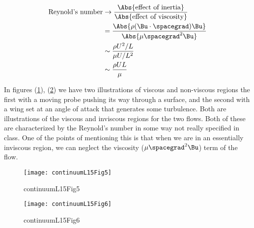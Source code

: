 \begin{align*}
\text{Reynold's number}
&\rightarrow
\frac{\Abs{\text{effect of inertia}}}{\Abs{\text{effect of viscosity}}}  \\
&=
\frac{ \Abs{\rho ( \Bu \cdot \spacegrad ) \Bu } }{\Abs{ \mu \spacegrad^2 \Bu}} \\
&\sim
\frac{ \rho U^2/L }{\mu U/L^2} \\
&\sim
\frac{ \rho U L }{\mu }
\end{align*}

In figures (\ref{fig:continuumL15:continuumL15Fig5}), (\ref{fig:continuumL15:continuumL15Fig6}) we have two illustrations of viscous and non-viscous regions the first with a moving probe pushing its way through a surface, and the second with a wing set at an angle of attack that generates some turbulence.  Both are illustrations of the viscous and inviscous regions for the two flows.  Both of these are characterized by the Reynold's number in some way not really specified in class.  One of the points of mentioning this is that when we are in an essentially inviscous region, we can neglect the viscosity ($\mu \spacegrad^2 \Bu$) term of the flow.
\begin{figure}[htp]
   \centering
   \texttt{[image: continuumL15Fig5]}
   \caption{continuumL15Fig5}\label{fig:continuumL15:continuumL15Fig5}
\end{figure}
\begin{figure}[htp]
   \centering
   \texttt{[image: continuumL15Fig6]}
   \caption{continuumL15Fig6}\label{fig:continuumL15:continuumL15Fig6}
\end{figure}


\EndArticle
